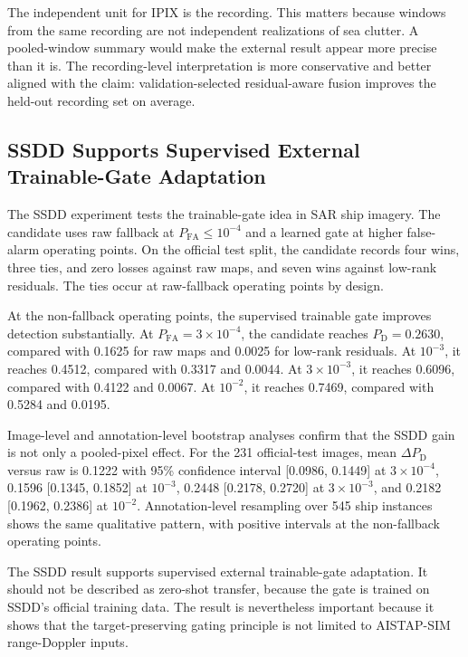 \documentclass[journal]{IEEEtran}
\begin{document}
The independent unit for IPIX is the recording. This matters because windows from the same recording are not independent realizations of sea clutter. A pooled-window summary would make the external result appear more precise than it is. The recording-level interpretation is more conservative and better aligned with the claim: validation-selected residual-aware fusion improves the held-out recording set on average.

\subsection{SSDD Supports Supervised External Trainable-Gate Adaptation}

The SSDD experiment tests the trainable-gate idea in SAR ship imagery. The candidate uses raw fallback at $P_{\mathrm{FA}} \leq 10^{-4}$ and a learned gate at higher false-alarm operating points. On the official test split, the candidate records four wins, three ties, and zero losses against raw maps, and seven wins against low-rank residuals. The ties occur at raw-fallback operating points by design.

At the non-fallback operating points, the supervised trainable gate improves detection substantially. At $P_{\mathrm{FA}}=3 \times 10^{-4}$, the candidate reaches $P_{\mathrm{D}}=0.2630$, compared with 0.1625 for raw maps and 0.0025 for low-rank residuals. At $10^{-3}$, it reaches 0.4512, compared with 0.3317 and 0.0044. At $3 \times 10^{-3}$, it reaches 0.6096, compared with 0.4122 and 0.0067. At $10^{-2}$, it reaches 0.7469, compared with 0.5284 and 0.0195.

Image-level and annotation-level bootstrap analyses confirm that the SSDD gain is not only a pooled-pixel effect. For the 231 official-test images, mean $\Delta P_{\mathrm{D}}$ versus raw is 0.1222 with 95\% confidence interval [0.0986, 0.1449] at $3 \times 10^{-4}$, 0.1596 [0.1345, 0.1852] at $10^{-3}$, 0.2448 [0.2178, 0.2720] at $3 \times 10^{-3}$, and 0.2182 [0.1962, 0.2386] at $10^{-2}$. Annotation-level resampling over 545 ship instances shows the same qualitative pattern, with positive intervals at the non-fallback operating points.

The SSDD result supports supervised external trainable-gate adaptation. It should not be described as zero-shot transfer, because the gate is trained on SSDD's official training data. The result is nevertheless important because it shows that the target-preserving gating principle is not limited to AISTAP-SIM range-Doppler inputs.
\end{document}
